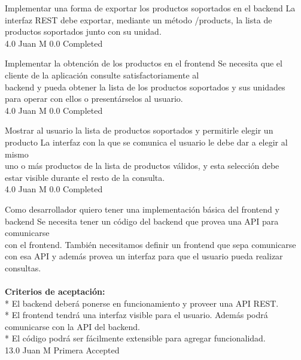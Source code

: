 		{Implementar una forma de exportar los productos soportados en el backend} %
		{La interfaz REST debe exportar, mediante un método /products, la lista de\\
productos soportados junto con su unidad.\\
} %
		{4.0} %
		{Juan M} %
		{0.0} %
		{Completed} %

		{Implementar la obtención de los productos en el frontend} %
		{Se necesita que el cliente de la aplicación consulte satisfactoriamente al\\
backend y pueda obtener la lista de los productos soportados y sus unidades\\
para operar con ellos o presentárselos al usuario.\\
} %
		{4.0} %
		{Juan M} %
		{0.0} %
		{Completed} %

		{Mostrar al usuario la lista de productos soportados y permitirle elegir un producto} %
		{La interfaz con la que se comunica el usuario le debe dar a elegir al mismo\\
uno o más productos de la lista de productos válidos, y esta selección debe\\
estar visible durante el resto de la consulta.\\
} %
		{4.0} %
		{Juan M} %
		{0.0} %
		{Completed} %


\vspace{20pt}

	{Como desarrollador quiero tener una implementación básica del frontend y backend} %
	{Se necesita tener un código del backend que provea una API para comunicarse\\
con el frontend. También necesitamos definir un frontend que sepa comunicarse\\
con esa API y además provea un interfaz para que el usuario pueda realizar\\
consultas.\\
  \\
\textbf{Criterios de aceptación:}\\
* El backend deberá ponerse en funcionamiento y proveer una API REST.  \\
* El frontend tendrá una interfaz visible para el usuario. Además podrá comunicarse con la API del backend.  \\
* El código podrá ser fácilmente extensible para agregar funcionalidad.\\
} %
	{} %
	{13.0} %
	{Juan M} %
	{Primera} %
	{Accepted} %


